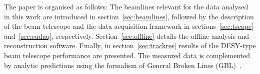 The paper is organised as follows: 
The beamlines relevant for the data analysed in this work are introduced in section~\ref{sec:beamlines}, followed by the description of the beam telescope
 and the data acquisition framework in sections~\ref{sec:tscope} and~\ref{sec:eudaq}, respectively.
Section~\ref{sec:offline} details the offline analysis and reconstruction software. 
Finally, in section~\ref{sec:trackres} results of the DESY-type beam telescope performance are presented. %
The measured data is complemented by analytic predictions using the formalism of General Broken Lines (GBL)~\cite{Blobel20111760,Kleinwort-2012}.

